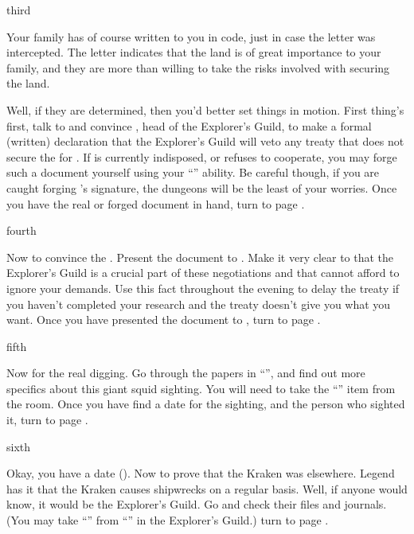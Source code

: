 \documentclass[greennotebook]{NeptuneBall}
\begin{document}
\begin{page}{third}

Your family has of course written to you in code, just in case the letter was intercepted. The letter indicates that the land is of great importance to your family, and they are more than willing to take the risks involved with securing the land. 

Well, if they are determined, then you'd better set things in motion. First thing's first, talk to \cPlant{} and convince \cPlant{\them}, head of the Explorer's Guild, to make a formal (written) declaration that the Explorer's Guild will veto any treaty that does not secure the \pGazaStrip{} for \pAtlantis{}. If \cPlant{\they} is currently indisposed, or refuses to cooperate, you may forge such a document yourself using your ``\aForge{}'' ability. Be careful though, if you are caught forging \cPlant{}'s signature, the dungeons will be the least of your worries.  Once you have the real or forged document in hand, turn to page .

\end{page}

\begin{page}{fourth}

Now to convince the \cKing{\King}. Present the document to \cKing{\King} \cKing{}. Make it very clear to \cKing{\them} that the Explorer's Guild is a crucial part of these negotiations and that \cKing{\they} cannot afford to ignore your demands. Use this fact throughout the evening to delay the treaty if you haven't completed your research and the treaty doesn't give you what you want. Once you have presented the document to \cKing{}, turn to page .

\end{page}

\begin{page}{fifth}

Now for the real digging. Go through the papers in ``\sPrince{}'', and find out more specifics about this giant squid sighting. You will need to take the ``\iReference{}'' item from the room. Once you have find a date for the sighting, and the person who sighted it, turn to page .

\end{page}

\begin{page}{sixth}

Okay, you have a date (\cKraken{\MYname}). Now to prove that the Kraken was elsewhere. Legend has it that the Kraken causes shipwrecks on a regular basis. Well, if anyone would know, it would be the Explorer's Guild. Go and check their files and journals. (You may take ``\iNorthSeasJournal{}'' from ``\sJournals{}'' in the Explorer's Guild.)  turn to page .

\end{page}
\end{document}
